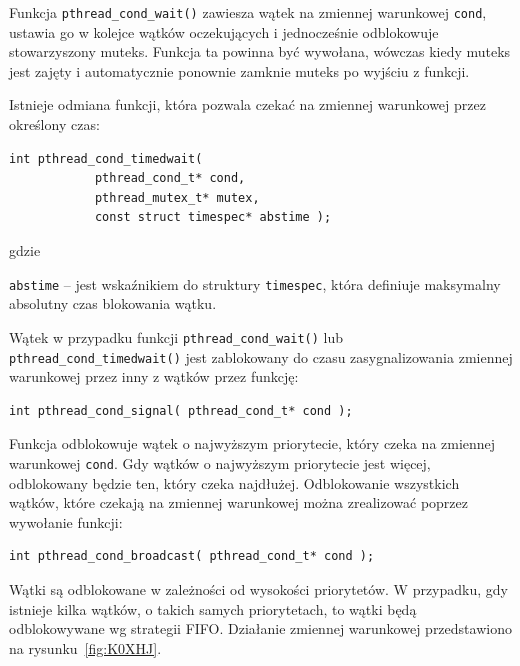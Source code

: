 Funkcja \lstinline[style=MyCStyle]{pthread_cond_wait()} zawiesza wątek na zmiennej warunkowej \lstinline[style=MyCStyle]{cond}, ustawia go w kolejce wątków oczekujących i jednocześnie odblokowuje stowarzyszony muteks. Funkcja ta powinna być wywołana, wówczas kiedy muteks jest zajęty i automatycznie ponownie zamknie muteks po wyjściu z funkcji.

Istnieje odmiana funkcji, która pozwala czekać na zmiennej warunkowej przez określony czas:

\begin{lstlisting}[style=MyCStyle]
int pthread_cond_timedwait(
            pthread_cond_t* cond,
            pthread_mutex_t* mutex,
            const struct timespec* abstime );
\end{lstlisting}
gdzie
\begin{myitemize}
\item \lstinline[style=MyCStyle]{abstime} -- jest wskaźnikiem do struktury \lstinline[style=MyCStyle]{timespec}, która definiuje maksymalny absolutny czas blokowania wątku.
\end{myitemize}

Wątek w przypadku funkcji \lstinline[style=MyCStyle]{pthread_cond_wait()} lub \lstinline[style=MyCStyle]{pthread_cond_timedwait()} jest zablokowany do czasu zasygnalizowania zmiennej warunkowej przez  inny z wątków przez funkcję:

\begin{lstlisting}[style=MyCStyle]
int pthread_cond_signal( pthread_cond_t* cond );
\end{lstlisting}

Funkcja odblokowuje wątek o najwyższym priorytecie, który czeka na zmiennej warunkowej \lstinline[style=MyCStyle]{cond}. Gdy wątków o najwyższym priorytecie jest więcej, odblokowany będzie ten, który czeka najdłużej. Odblokowanie wszystkich wątków, które czekają na zmiennej warunkowej można zrealizować poprzez wywołanie funkcji:

\begin{lstlisting}[style=MyCStyle]
int pthread_cond_broadcast( pthread_cond_t* cond );
\end{lstlisting}

Wątki są odblokowane w zależności od wysokości priorytetów. W przypadku, gdy istnieje kilka wątków, o takich samych priorytetach, to wątki będą odblokowywane wg strategii FIFO. Działanie zmiennej warunkowej przedstawiono na rysunku~\ref{fig:K0XHJ}.

